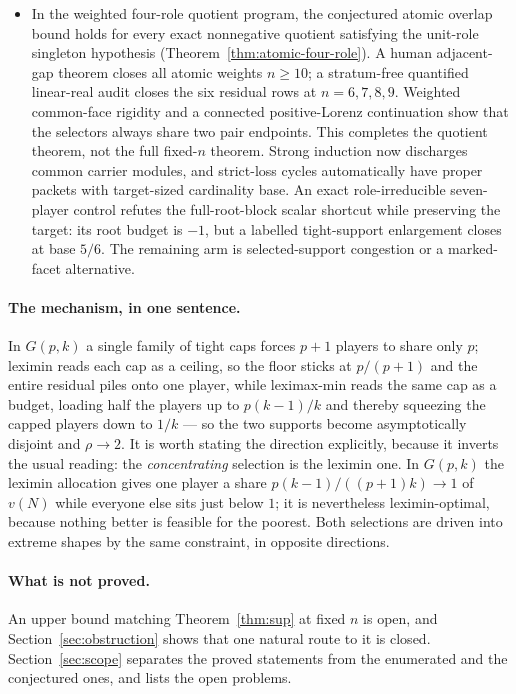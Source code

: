 \documentclass[11pt]{article}
\begin{document}
\begin{itemize}[nosep]
      and tends to \(14/9\).  Every selector has a sparse hand proof, with
      symbolic and independently formulated exact replays.
      The sharp values \(s(n)\) for \(n\ge7\) are not determined.
\item In the weighted four-role quotient program, the conjectured atomic
      overlap bound holds for every exact nonnegative quotient satisfying
      the unit-role singleton hypothesis
      (Theorem~\ref{thm:atomic-four-role}).
      A human adjacent-gap theorem closes all atomic weights $n\ge10$; a
      stratum-free quantified linear-real audit closes the six residual rows
      at $n=6,7,8,9$.  Weighted common-face rigidity and a connected
      positive-Lorenz continuation show that the selectors always share two
      pair endpoints.  This completes the quotient theorem, not the full
      fixed-$n$ theorem.  Strong induction now discharges common carrier
      modules, and strict-loss cycles automatically have proper packets with
      target-sized cardinality base.  An exact role-irreducible seven-player
      control refutes the full-root-block scalar shortcut while preserving the
      target: its root budget is $-1$, but a labelled tight-support enlargement
      closes at base $5/6$.  The remaining arm is selected-support congestion
      or a marked-facet alternative.
\end{itemize}

\paragraph{The mechanism, in one sentence.}
In $G(p,k)$ a single family of tight caps forces $p+1$ players to share only
$p$; leximin reads each cap as a ceiling, so the floor sticks at $p/(p+1)$
and the entire residual piles onto one player, while leximax-min reads the
same cap as a budget, loading half the players up to $p(k-1)/k$ and thereby
squeezing the capped players down to $1/k$ --- so the two supports become
asymptotically disjoint and $\rho\to2$.  It is worth stating the direction
explicitly, because it inverts the usual reading: the \emph{concentrating}
selection is the leximin one.  In $G(p,k)$ the leximin allocation gives one
player a share $p(k-1)/((p+1)k)\to1$ of $v(N)$ while everyone else sits just
below $1$; it is nevertheless leximin-optimal, because nothing better is
feasible for the poorest.  Both selections are driven into extreme shapes by
the same constraint, in opposite directions.

\paragraph{What is not proved.}
An upper bound matching Theorem~\ref{thm:sup} at fixed $n$ is open, and
Section~\ref{sec:obstruction} shows that one natural route to it is closed.
Section~\ref{sec:scope} separates the proved statements from the enumerated
and the conjectured ones, and lists the open problems.
\end{document}
